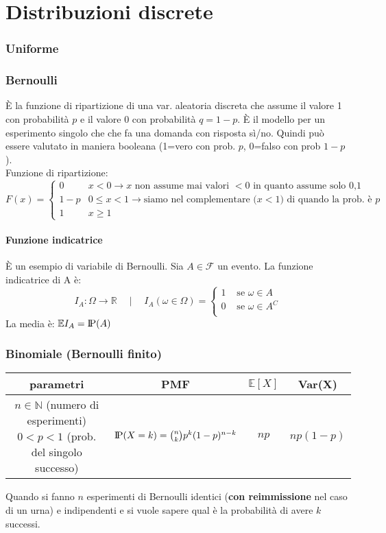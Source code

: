\documentclass[a4paper,10pt]{article}
\newcommand{\pr}{\text{I\kern-0.15em P}} %
\newcommand{\ex}{\mathbb{E}} %
\theoremstyle{remark}
\theoremstyle{definition}
\begin{document}
\part*{Distribuzioni discrete}

\section{Uniforme}
\section{Bernoulli}
È la funzione di ripartizione di una var. aleatoria discreta che assume il valore 1 con probabilità $p$ e il valore 0 con probabilità $q=1-p$. È il modello per un esperimento singolo che che fa una domanda con risposta sì/no. Quindi può essere valutato in maniera booleana (1=vero con prob. $p$, 0=falso con prob $1-p$). \\
Funzione di ripartizione:
$$F(x)=
\begin{cases}
    0 &x<0 \rightarrow x\text{ non assume mai valori $<0$ in quanto assume solo 0,1}\\
    1-p &0\le x<1  \rightarrow \text{siamo nel complementare ($x<1$) di quando la prob. è $p$}\\
    1 &x\ge1
\end{cases}$$

\subsection*{Funzione indicatrice} È un esempio di variabile di Bernoulli. Sia $A\in\mathcal{F}$ un evento. La funzione indicatrice di A è:
\[I_A: \Omega \to \mathbb{R} \quad \mid \quad I_A(\omega\in\Omega)= 
\begin{cases}
    1 &\text{ se } \omega \in A \\
    0 &\text{ se } \omega \in A^C \\
\end{cases}\]
La media è: $\ex I_A=\pr(A)$

\section{Binomiale (Bernoulli finito)}
\begin{center}
\begin{tabular}{ |c|c|c|c| } 
 \hline
 parametri & PMF & $\ex[X]$ & Var(X) \\ 
 \hline 
 \shortstack{$n\in \mathbb{N}$ (numero di esperimenti) \\ $0<p<1$ (prob. del singolo successo)} & $\pr(X=k)=\binom{n}{k}p^k(1-p)^{n-k}$ & $np$ & $np(1-p)$\\ 
 \hline
\end{tabular}
\end{center}
Quando si fanno $n$ esperimenti di Bernoulli identici (\textbf{con reimmissione} nel caso di un urna) e indipendenti e si vuole sapere qual è la probabilità di avere $k$ successi.
\end{document}
